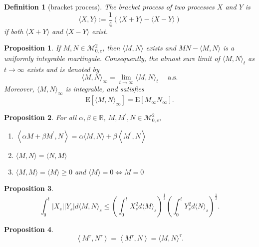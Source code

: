 \documentclass{article}
\newtheorem{definition}{Definition}[section]
\newtheorem{proposition}{Proposition}[section]
\theoremstyle{nonumberplain}
\begin{document}
\begin{definition}[bracket process]	
	The bracket process of two processes $X$ and $Y$ is
	\[
	\langle X, Y\rangle:=\frac{1}{4}\left(\langle X+Y\rangle-\langle X-Y\rangle\right)
	\] 
	if both $\langle X+Y\rangle$ and $\langle X-Y\rangle$ exist.
\end{definition}

\begin{proposition}
	If $M,N\in\mathscr{M}^2_{0,c}$, then $\langle M, N\rangle$ exists and $MN-\langle M, N\rangle$ is a uniformly integrable martingale. Consequently, the almost sure limit of $\langle M, N\rangle_{t}$ as $t \rightarrow \infty$ exists and is denoted by
	\[
	\langle M, N\rangle_{\infty}=\lim_{t\to\infty}\langle M, N\rangle_{t}\quad\text{ a.s.}
	\]
	Moreover, $\langle M, N\rangle_{\infty}$ is integrable, and satisfies
	\[
	\mathrm{E}\left[\langle M, N\rangle_{\infty}\right]=\mathrm{E}\left[M_{\infty} N_{\infty}\right].
	\]
\end{proposition}

\begin{proposition}
For all $\alpha, \beta \in \mathbb{R}$, $M, M^{\prime}, N \in \mathscr{M}^2_{0,c},$

\begin{enumerate}
	\item $\left\langle\alpha M+\beta M^{\prime}, N\right\rangle=\alpha\langle M, N\rangle+\beta\left\langle M^{\prime}, N\right\rangle$
	\item$\langle M, N\rangle=\langle N, M\rangle$
	\item$\langle M, M\rangle=\langle M\rangle \geq 0$ and $\langle M\rangle= 0 \iff M=0$
\end{enumerate}
\end{proposition}

\begin{proposition}
\[
\int_{0}^{t}\left|X_{s}\right|\left|Y_{s}\right| d\langle M, N\rangle_{s} \leq\left(\int_{0}^{t} X_{s}^{2} d\langle M\rangle_{s}\right)^{\frac{1}{2}}\left(\int_{0}^{t} Y_{s}^{2} d\langle N\rangle_{s}\right)^{\frac{1}{2}}.
\]
\end{proposition}

\begin{proposition}
	\[
	\left\langle M^{\tau}, N^{\tau}\right\rangle=\left\langle M^{\tau}, N\right\rangle=\langle M, N\rangle^{\tau}.
	\]
\end{proposition}
\end{document}
